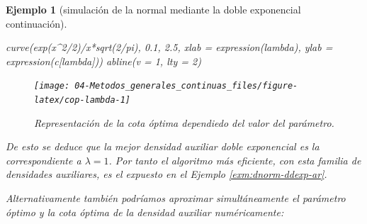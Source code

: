 \documentclass[
]{book}
\newenvironment{Shaded}{\begin{snugshade}}{\end{snugshade}}
\newcommand{\AttributeTok}[1]{\textcolor[rgb]{0.77,0.63,0.00}{#1}}
\newcommand{\CommentTok}[1]{\textcolor[rgb]{0.56,0.35,0.01}{\textit{#1}}}
\newcommand{\ConstantTok}[1]{\textcolor[rgb]{0.00,0.00,0.00}{#1}}
\newcommand{\ControlFlowTok}[1]{\textcolor[rgb]{0.13,0.29,0.53}{\textbf{#1}}}
\newcommand{\DecValTok}[1]{\textcolor[rgb]{0.00,0.00,0.81}{#1}}
\newcommand{\FloatTok}[1]{\textcolor[rgb]{0.00,0.00,0.81}{#1}}
\newcommand{\FunctionTok}[1]{\textcolor[rgb]{0.00,0.00,0.00}{#1}}
\newcommand{\NormalTok}[1]{#1}
\newcommand{\OtherTok}[1]{\textcolor[rgb]{0.56,0.35,0.01}{#1}}
\newcommand{\SpecialCharTok}[1]{\textcolor[rgb]{0.00,0.00,0.00}{#1}}
\theoremstyle{break}
\newtheorem{example}{Ejemplo}[chapter]
\theoremstyle{nonumberplain}
\renewcommand{\CommentTok}[1]{\textcolor[rgb]{0.41,0.41,0.41}{\texttt{#1}}}
\begin{document}
\begin{example}[simulación de la normal mediante la doble exponencial continuación]
\begin{Shaded}
\begin{Highlighting}[]
\FunctionTok{curve}\NormalTok{(}\FunctionTok{exp}\NormalTok{(x}\SpecialCharTok{\^{}}\DecValTok{2}\SpecialCharTok{/}\DecValTok{2}\NormalTok{)}\SpecialCharTok{/}\NormalTok{x}\SpecialCharTok{*}\FunctionTok{sqrt}\NormalTok{(}\DecValTok{2}\SpecialCharTok{/}\NormalTok{pi), }\FloatTok{0.1}\NormalTok{, }\FloatTok{2.5}\NormalTok{,}
       \AttributeTok{xlab =} \FunctionTok{expression}\NormalTok{(lambda), }\AttributeTok{ylab =} \FunctionTok{expression}\NormalTok{(c[lambda]))}
\FunctionTok{abline}\NormalTok{(}\AttributeTok{v =} \DecValTok{1}\NormalTok{, }\AttributeTok{lty =} \DecValTok{2}\NormalTok{)}
\end{Highlighting}
\end{Shaded}

\begin{figure}[!htb]

{\centering \texttt{[image: 04-Metodos\_generales\_continuas\_files/figure-latex/cop-lambda-1]} 

}

\caption{Representación de la cota óptima dependiedo del valor del parámetro.}\label{fig:cop-lambda}
\end{figure}

De esto se deduce que la mejor densidad auxiliar doble exponencial es la correspondiente a \(\lambda=1\).
Por tanto el algoritmo más eficiente, con esta familia de densidades auxiliares, es el expuesto en el Ejemplo \ref{exm:dnorm-ddexp-ar}.

Alternativamente también podríamos aproximar simultáneamente el parámetro óptimo y la cota óptima de la densidad auxiliar numéricamente:

\begin{Shaded}
\end{Shaded}


\end{example}
\end{document}
